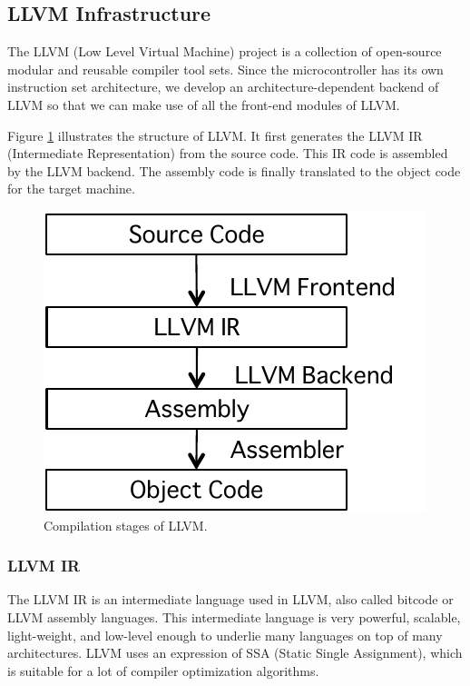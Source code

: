 \subsection{LLVM Infrastructure}

The LLVM (Low Level Virtual Machine) project is a collection of
open-source modular and reusable compiler tool sets.
Since the microcontroller has its own instruction set architecture, we
develop an architecture-dependent backend of LLVM so that we can make
use of all the front-end modules of LLVM.

Figure \ref{fig:llvm} illustrates the structure of LLVM.
It first generates the LLVM IR (Intermediate Representation) from the
source code. 
This IR code is assembled by the LLVM backend.
The assembly code is finally translated to the object code for the
target machine.

\begin{figure}
\begin{center}
\includegraphics[scale = 0.5]{./img/llvmflow.pdf}
\end{center}
\caption{Compilation stages of LLVM.}
\label{fig:llvm}
\end{figure}

\subsubsection{LLVM IR}

The LLVM IR is an intermediate language used in LLVM, also called bitcode or
LLVM assembly languages.
This intermediate language is very powerful, scalable, light-weight, and
low-level enough to underlie many languages on top of many
architectures.
LLVM uses an expression of SSA (Static Single Assignment), which is
suitable for a lot of compiler optimization algorithms.

